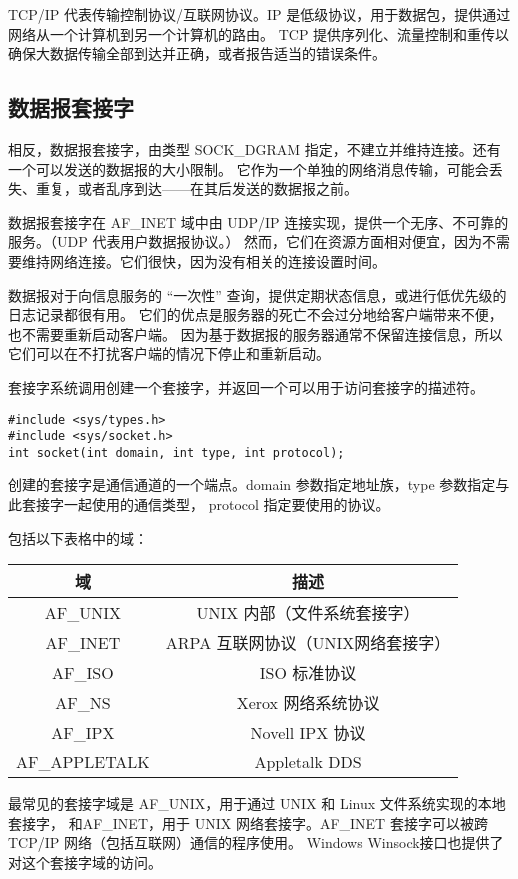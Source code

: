 \documentclass{ctexart}
\begin{document}
TCP/IP 代表传输控制协议/互联网协议。IP 是低级协议，用于数据包，提供通过网络从一个计算机到另一个计算机的路由。
TCP 提供序列化、流量控制和重传以确保大数据传输全部到达并正确，或者报告适当的错误条件。  

\subsection{数据报套接字}  
相反，数据报套接字，由类型 SOCK\_DGRAM 指定，不建立并维持连接。还有一个可以发送的数据报的大小限制。
它作为一个单独的网络消息传输，可能会丢失、重复，或者乱序到达——在其后发送的数据报之前。  
  
数据报套接字在 AF\_INET 域中由 UDP/IP 连接实现，提供一个无序、不可靠的服务。（UDP 代表用户数据报协议。）
然而，它们在资源方面相对便宜，因为不需要维持网络连接。它们很快，因为没有相关的连接设置时间。  
  
数据报对于向信息服务的 ``一次性'' 查询，提供定期状态信息，或进行低优先级的日志记录都很有用。
它们的优点是服务器的死亡不会过分地给客户端带来不便，也不需要重新启动客户端。
因为基于数据报的服务器通常不保留连接信息，所以它们可以在不打扰客户端的情况下停止和重新启动。  
  
套接字系统调用创建一个套接字，并返回一个可以用于访问套接字的描述符。  
\begin{verbatim}  
#include <sys/types.h>  
#include <sys/socket.h>  
int socket(int domain, int type, int protocol);  
\end{verbatim}  
创建的套接字是通信通道的一个端点。domain 参数指定地址族，type 参数指定与此套接字一起使用的通信类型，
protocol 指定要使用的协议。  
  
包括以下表格中的域：  
\begin{center}  
\begin{tabular}{|c|c|}  
\hline  
域 & 描述 \\  
\hline  
AF\_UNIX & UNIX 内部（文件系统套接字） \\  
\hline  
AF\_INET & ARPA 互联网协议（UNIX网络套接字） \\  
\hline  
AF\_ISO & ISO 标准协议 \\  
\hline  
AF\_NS & Xerox 网络系统协议 \\  
\hline  
AF\_IPX & Novell IPX 协议 \\  
\hline  
AF\_APPLETALK & Appletalk DDS \\  
\hline  
\end{tabular}  
\end{center}  
  
最常见的套接字域是 AF\_UNIX，用于通过 UNIX 和 Linux 文件系统实现的本地套接字，
和AF\_INET，用于 UNIX 网络套接字。AF\_INET 套接字可以被跨 TCP/IP 网络（包括互联网）通信的程序使用。
Windows Winsock接口也提供了对这个套接字域的访问。  
  
\end{document}
